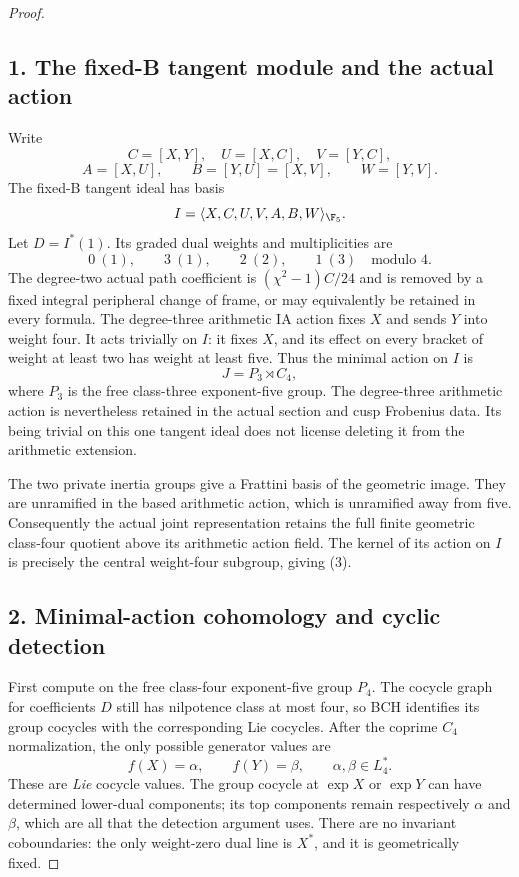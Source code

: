 \begin{proof}
\subsection*{1. The fixed-B tangent module and the actual action}
Write
\[
 C=[X,Y],\quad U=[X,C],\quad V=[Y,C],
\]
\[
 A=[X,U],\qquad B=[Y,U]=[X,V],\qquad W=[Y,V].
\]
The fixed-B tangent ideal has basis
\[
 I=\langle X,C,U,V,A,B,W\rangle_{\F_5}.
\]
Let $D=I^*(1)$. Its graded dual weights and multiplicities are
\[
 0\ (1),\qquad 3\ (1),\qquad 2\ (2),\qquad 1\ (3)
 \quad\text{modulo }4.
 \tag{2}
\]
The degree-two actual path coefficient is $(\chi^2-1)C/24$ and is removed by a fixed integral peripheral change of frame, or may equivalently be retained in every formula. The degree-three arithmetic IA action fixes $X$ and sends $Y$ into weight four. It acts trivially on $I$: it fixes $X$, and its effect on every bracket of weight at least two has weight at least five. Thus the minimal action on $I$ is
\[
 J=P_3\rtimes C_4,
 \tag{3}
\]
where $P_3$ is the free class-three exponent-five group. The degree-three arithmetic action is nevertheless retained in the actual section and cusp Frobenius data. Its being trivial on this one tangent ideal does not license deleting it from the arithmetic extension.

The two private inertia groups give a Frattini basis of the geometric image. They are unramified in the based arithmetic action, which is unramified away from five. Consequently the actual joint representation retains the full finite geometric class-four quotient above its arithmetic action field. The kernel of its action on $I$ is precisely the central weight-four subgroup, giving (3).

\subsection*{2. Minimal-action cohomology and cyclic detection}
First compute on the free class-four exponent-five group $P_4$. The cocycle graph for coefficients $D$ still has nilpotence class at most four, so BCH identifies its group cocycles with the corresponding Lie cocycles. After the coprime $C_4$ normalization, the only possible generator values are
\[
 f(X)=\alpha,\qquad f(Y)=\beta,
 \qquad \alpha,\beta\in L_4^*.
 \tag{4}
\]
These are \emph{Lie} cocycle values. The group cocycle at $\exp X$ or $\exp Y$ can have determined lower-dual components; its top components remain respectively $\alpha$ and $\beta$, which are all that the detection argument uses. There are no invariant coboundaries: the only weight-zero dual line is $X^*$, and it is geometrically fixed.


\end{proof}
